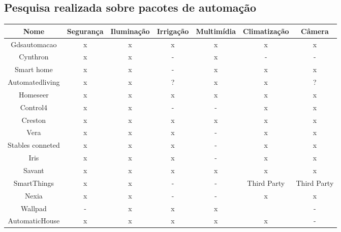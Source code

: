 \subsection{Pesquisa realizada sobre pacotes de automação}
\begin{tabular}{|c|c|c|c|c|c|c|}
\hline 
\textbf{Nome} & \textbf{Segurança} & \textbf{Iluminação} & \textbf{Irrigação} & \textbf{Multimídia} & \textbf{Climatização} & \textbf{Câmera}\tabularnewline
\hline 
\hline 
Gdsautomacao & x & x & x & x & x & x\tabularnewline
\hline 
Cynthron & x & x & - & x & - & -\tabularnewline
\hline 
Smart home  & x & x & - & x & x & x\tabularnewline
\hline 
Automatedliving  & x & x & ? & x & x & ?\tabularnewline
\hline 
Homeseer & x & x & x & x & x & x\tabularnewline
\hline 
Control4 & x & x & - & - & x & x\tabularnewline
\hline 
Creston  & x & x & x & x & x & x\tabularnewline
\hline 
Vera  & x & x & x & - & x & x\tabularnewline
\hline 
Stables conneted  & x & x & x & - & x & x\tabularnewline
\hline 
Iris & x & x & x & - & x & x\tabularnewline
\hline 
Savant & x & x & x & x & x & x\tabularnewline
\hline 
SmartThings  & x & x & - & - & Third Party & Third Party\tabularnewline
\hline 
Nexia & x & x & - & - & x & x\tabularnewline
\hline 
Wallpad  & - & x & x & x &  & -\tabularnewline
\hline 
AutomaticHouse & x & x & x & x & x & -\tabularnewline
\hline 
\end{tabular}





